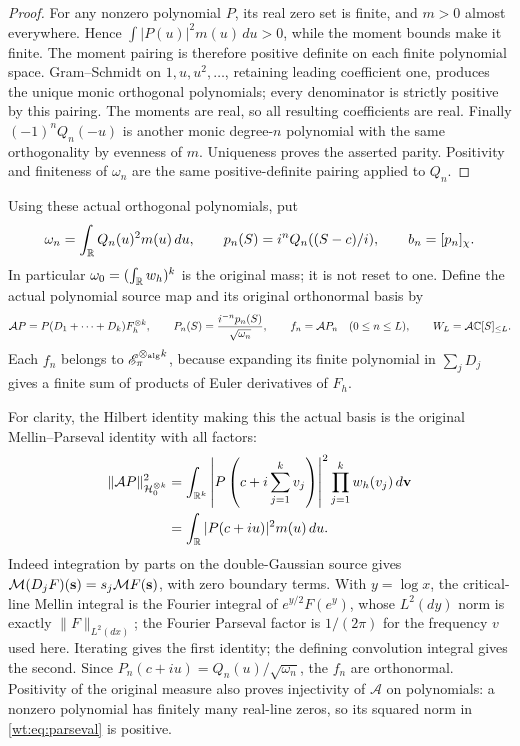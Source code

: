 \begin{proof}
For any nonzero polynomial $P$, its real zero set is finite,
and $m>0$ almost everywhere.  Hence
$\int |P(u)|^2m(u)\,du>0$, while the moment bounds make it
finite.  The moment pairing is therefore positive definite
on each finite polynomial space.  Gram--Schmidt on
$1,u,u^2,\ldots$, retaining leading coefficient one, produces
the unique monic orthogonal polynomials; every denominator is
strictly positive by this pairing.  The moments are real,
so all resulting coefficients are real.  Finally
$(-1)^nQ_n(-u)$ is another monic degree-$n$ polynomial with
the same orthogonality by evenness of $m$.  Uniqueness proves
the asserted parity.  Positivity and finiteness of $\omega_n$
are the same positive-definite pairing applied to $Q_n$.
\end{proof}

Using these actual orthogonal polynomials, put
\[
 \omega_n=\int_\mathbb R Q_n(u)^2m(u)\,du,\qquad
 p_n(S)=i^nQ_n((S-c)/i),\qquad b_n=[p_n]_\chi.
\]
In particular $\omega_0=(\int_\mathbb R w_h)^k$ is the original mass;
it is not reset to one.  Define the actual polynomial source map
and its original orthonormal basis by
\begin{equation}\label{wt:eq:actual-source}
 \mathcal AP=P(D_1+\cdots+D_k)F_h^{\otimes k},\qquad
 P_n(S)=\frac{i^{-n}p_n(S)}{\sqrt{\omega_n}},\qquad
 f_n=\mathcal AP_n\quad(0\leq n\leq L),\qquad
 W_L=\mathcal A\mathbb C[S]_{\leq L}.
\end{equation}
Each $f_n$ belongs to $\mathscr E_\pi^{\otimes_{\mathrm{alg}} k}$,
because expanding its finite polynomial in $\sum_jD_j$ gives
a finite sum of products of Euler derivatives of $F_h$.

For clarity, the Hilbert identity making this the actual basis
is the original Mellin--Parseval identity with all factors:
\begin{equation}\label{wt:eq:parseval}
 \begin{split}
 \|\mathcal AP\|_{\mathcal H_0^{\otimes k}}^2
 &=\int_{\mathbb R^k}\left|P\left(c+i\sum_{j=1}^kv_j\right)\right|^2
              \prod_{j=1}^kw_h(v_j)\,d\mathbf v\\
 &=\int_\mathbb R|P(c+iu)|^2m(u)\,du.
 \end{split}
\end{equation}
Indeed integration by parts on the double-Gaussian source gives
$\mathcal M(D_jF)(\mathbf s)=s_j\mathcal M F(\mathbf s)$, with zero
boundary terms.  With $y=\log x$, the critical-line Mellin
integral is the Fourier integral of $e^{y/2}F(e^y)$, whose
$L^2(dy)$ norm is exactly $\|F\|_{L^2(dx)}$; the Fourier
Parseval factor is $1/(2\pi)$ for the frequency $v$ used here.
Iterating gives the first identity; the defining convolution
integral gives the second.  Since $P_n(c+iu)=Q_n(u)/\sqrt{\omega_n}$,
the $f_n$ are orthonormal.  Positivity of the original measure
also proves injectivity of $\mathcal A$ on polynomials: a nonzero
polynomial has finitely many real-line zeros, so its squared
norm in \eqref{wt:eq:parseval} is positive.

